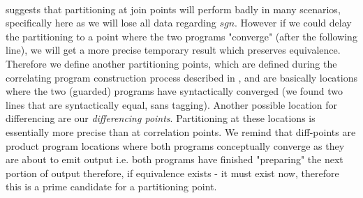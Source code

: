 \\
suggests that partitioning at join points will perform badly in many scenarios, specifically here as we will lose all data regarding $sgn$. However if we could delay the partitioning to a point where the two programs "converge" (after the following  line), we will get a more precise temporary result which preserves equivalence. Therefore we define another partitioning points, which are defined during the correlating program construction process described in , and are basically locations where the two (guarded) programs have syntactically converged (we found two lines that are syntactically equal, sans tagging). Another possible location for differencing are our \emph{differencing points}. Partitioning at these locations is essentially more precise than at correlation points. We remind that diff-points are product program locations where both programs conceptually converge as they are about to emit output i.e. both programs have finished "preparing" the next portion of output therefore, if equivalence exists - it must exist now, therefore this is a prime candidate for a partitioning point. 



